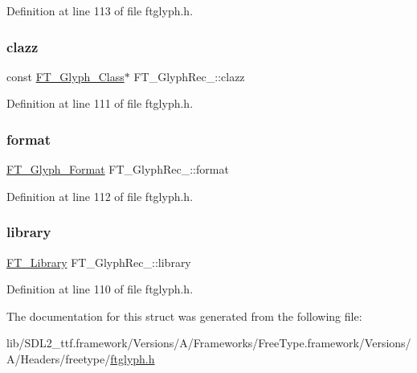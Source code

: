 Definition at line 113 of file ftglyph.\+h.

\mbox{\label{struct_f_t___glyph_rec___ad7074cfe0e9fd6616e4dc4011e481524}} 
\subsubsection{\texorpdfstring{clazz}{clazz}}
{\footnotesize\ttfamily const \mbox{\hyperlink{ftglyph_8h_ad05b3999d93247f41f1c4ac20ea0104b}{F\+T\+\_\+\+Glyph\+\_\+\+Class}}$\ast$ F\+T\+\_\+\+Glyph\+Rec\+\_\+\+::clazz}



Definition at line 111 of file ftglyph.\+h.

\mbox{\label{struct_f_t___glyph_rec___a26b42a2610a69dcaed3e7c8b6d506211}} 
\subsubsection{\texorpdfstring{format}{format}}
{\footnotesize\ttfamily \mbox{\hyperlink{ftimage_8h_aeca0d10a27aedecbf96515e0628aff1f}{F\+T\+\_\+\+Glyph\+\_\+\+Format}} F\+T\+\_\+\+Glyph\+Rec\+\_\+\+::format}



Definition at line 112 of file ftglyph.\+h.

\mbox{\label{struct_f_t___glyph_rec___a00679b5e2519affab0f3999718817f8e}} 
\subsubsection{\texorpdfstring{library}{library}}
{\footnotesize\ttfamily \mbox{\hyperlink{freetype_8h_a92857f8bf079b7b9ef5d3ce74cf89ef5}{F\+T\+\_\+\+Library}} F\+T\+\_\+\+Glyph\+Rec\+\_\+\+::library}



Definition at line 110 of file ftglyph.\+h.



The documentation for this struct was generated from the following file\+:\begin{DoxyCompactItemize}
\item 
lib/\+S\+D\+L2\+\_\+ttf.\+framework/\+Versions/\+A/\+Frameworks/\+Free\+Type.\+framework/\+Versions/\+A/\+Headers/freetype/\mbox{\hyperlink{ftglyph_8h}{ftglyph.\+h}}\end{DoxyCompactItemize}
